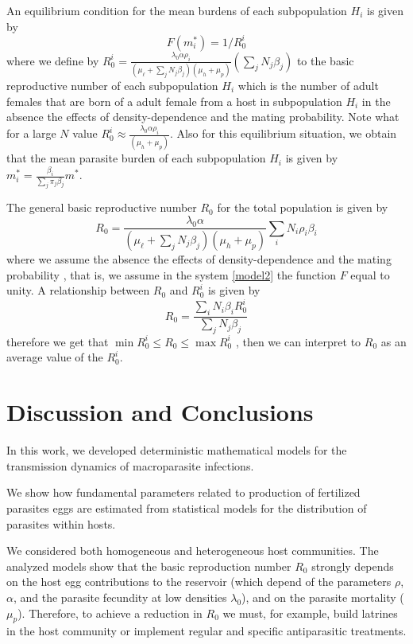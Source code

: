 \documentclass[eng]{MMSB-class-eng}
\begin{document}
An equilibrium condition for the mean burdens of each subpopulation $H_{i}$ is given by
\begin{equation}%
F(m^*_{i})=1/R_0^{i}
\end{equation}
where we define by
$R_0^{i}=\frac{ \lambda_0 \alpha \rho_{i}}{ (\mu_{\ell}+\sum_j N_j \beta_j )(\mu_{h}+\mu_p)} \left( \sum_j N_j\beta_{j} \right) $
to the basic reproductive number of each subpopulation $H_{i}$
which is the number of adult females 
that are born of a 
adult female from a host in subpopulation $H_{i}$ in the absence the effects of density-dependence and the mating probability.
Note  what for a large $N$ value $R_0^i\approx \frac{ \lambda_0 \alpha  \rho_i }{ (\mu_h + \mu_p) }$.  
Also for this equilibrium situation, we obtain that the mean parasite burden of each subpopulation $H_{i}$ is given by $m_{i}^*=\frac{\beta_{i}}{ \sum_j \pi_j\beta_{j } }m^*$.

The general basic reproductive number $R_0$ for the total population is given by %
\begin{equation}\label{valorR0}
R_{0}=\frac{\lambda_0 \alpha }
{ (\mu_{\ell}+\sum_j N_j \beta_j  )(\mu_{h}+\mu_p)}
\sum_i N_i \rho_{i} \beta_{i}   
\end{equation}
where we assume the absence the effects of density-dependence and the mating probability \citep{anderson1992infectious}, that is, we assume in the system \eqref{model2} the function $F$ equal to unity.
A relationship between $R_0$ and $R_0^i$ is given by
\begin{equation}
R_{0}=\frac{\sum_i N_i\beta_{i}R_0^i}
{\sum_j N_j \beta_{j}}   
\end{equation}
therefore we get that $\min R_0^i\leq R_0 \leq \max R_0^i$
, then we can interpret to $R_0$ as an average value of the $R_0^i$.


\section{Discussion and Conclusions}

In this work, we developed deterministic mathematical models for the transmission dynamics of macroparasite infections. 

We show how fundamental parameters related to production of fertilized parasites eggs are estimated from statistical models for the distribution of
parasites within hosts.	

We considered both homogeneous and heterogeneous host communities. 
The analyzed models show that the basic reproduction number $R_0$ strongly depends 
on the
host egg contributions to the reservoir (which depend of the parameters $\rho$, $\alpha$, and the parasite fecundity at low densities $\lambda_0 $), and on the parasite mortality ($\mu_p$). 
Therefore, to achieve a reduction in $R_0$ we must, for example, build latrines in the host community or implement regular and specific antiparasitic treatments.
\end{document}
